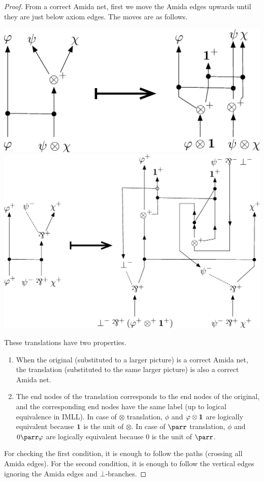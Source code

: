  \begin{proof}
  From a correct Amida net, first we move the Amida edges upwards
  until they are just below axiom edges.
The moves are as follows.
 \begin{center}
\includegraphics[scale=0.4]{tensor-move.eps}
\vskip 3cm
\includegraphics[scale=0.35]{parr-move.eps}
 \end{center}
These translations have two properties.
\begin{enumerate}
 \item When the original (substituted to a larger picture)
       is a correct Amida net, the translation (substituted to the same
       larger picture) is also a correct Amida net.
 \item The end nodes of the translation corresponds to the end nodes of
       the original, and the corresponding end nodes have the same label
       (up to logical equivalence in IMLL).  In case of $\otimes$
       translation, $\phi$ and
       $\varphi\otimes \mathbf{1}$ are logically equivalent because $\mathbf{1}$ is the
       unit of $\otimes$.
       In case of $\parr$ translation, $\phi$ and $0\parr \phi$ are
       logically equivalent because $0$ is the unit of $\parr$.
\end{enumerate}
For checking the first condition, it is enough to follow the paths
(crossing all Amida edges).
For the second condition, it is enough to follow the vertical edges
ignoring the Amida edges and $\bot$-branches.


\end{proof}
